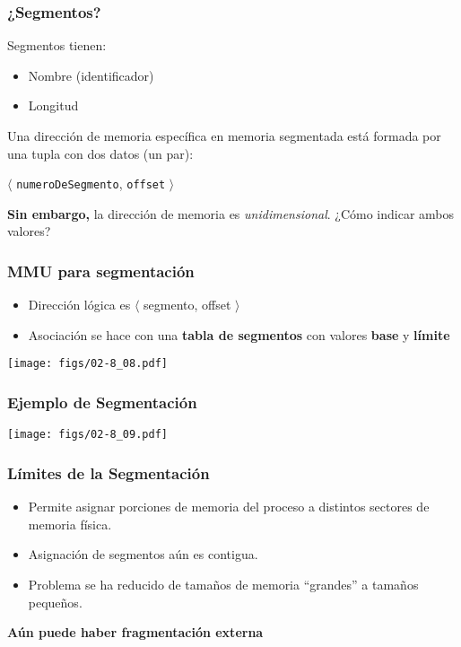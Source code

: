 \documentclass[letter]{beamer}
\begin{document}
\begin{frame}
  \frametitle{¿Segmentos?}

  Segmentos tienen:
  \begin{itemize}
    \item Nombre (identificador)
    \item Longitud
  \end{itemize}

  Una dirección de memoria específica en memoria segmentada está formada por una tupla con dos datos (un par):
  \begin{center}
  $\langle$ {\tt numeroDeSegmento}, {\tt offset} $\rangle$
  \end{center}
  
  {\bf Sin embargo,} la dirección de memoria es {\em unidimensional}.
  ¿Cómo indicar ambos valores?
\end{frame}


\begin{frame}
  \frametitle{MMU para segmentación}

    \begin{itemize}
      \item Dirección lógica es $\langle$ segmento, offset $\rangle$
      \item Asociación se hace con una {\bf tabla de segmentos} con valores {\bf base} y {\bf límite}
    \end{itemize}

    \begin{center}
      \texttt{[image: figs/02-8\_08.pdf]}
    \end{center}

\end{frame}

\begin{frame}
  \frametitle{Ejemplo de Segmentación}

  \begin{center}
    \texttt{[image: figs/02-8\_09.pdf]}
  \end{center}


\end{frame}
\begin{frame}
  \frametitle{Límites de la Segmentación}

  \begin{itemize}
    \item Permite asignar porciones de memoria del proceso a distintos
          sectores de memoria física.
    \item Asignación de segmentos aún es contigua.
    \item Problema se ha reducido de tamaños de memoria ``grandes'' a tamaños
          pequeños.
  \end{itemize}
  {\bf Aún puede haber fragmentación externa}
\end{frame}
\end{document}
